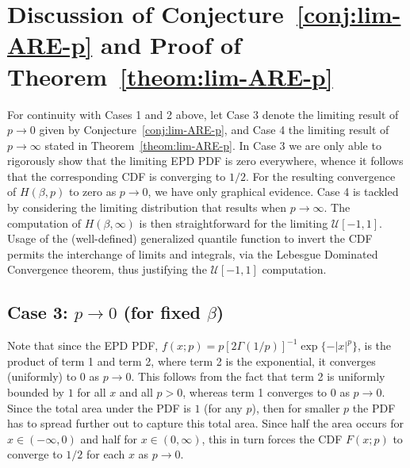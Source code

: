 \documentclass[11pt]{article}
\newcommand{\cb}{\color{blue}}
\newcommand{\nc}{\normalcolor}
\begin{document}
\cb
\section{Discussion of Conjecture~\ref{conj:lim-ARE-p} and Proof of Theorem~\ref{theom:lim-ARE-p}}\label{app:lims-theom-p}

For continuity with Cases 1 and 2 above, let Case 3 denote the limiting result of $p \rightarrow 0$ given by
Conjecture~\ref{conj:lim-ARE-p}, and Case 4 the limiting result of $p
\rightarrow \infty$ stated in Theorem~\ref{theom:lim-ARE-p}.
\nc In Case 3 we are only able to rigorously show
that the limiting EPD PDF is zero everywhere, whence it follows
that the corresponding CDF is converging to $1/2$. 
For the resulting convergence of $H(\beta,p)$ to zero as $p
\rightarrow 0$, we
have only graphical evidence. Case 4 is  tackled by considering the limiting
distribution that results when $p \rightarrow\infty$. The computation of $H(\beta,\infty)$
is then straightforward for the limiting $\mathcal{U}[-1,1]$. Usage
of the (well-defined) generalized quantile function to invert the CDF
permits the interchange of limits and integrals, via
the Lebesgue Dominated Convergence theorem, thus justifying the $\mathcal{U}[-1,1]$ computation. 
\subsection*{Case 3: $p \rightarrow 0$ (for fixed $\beta$)}
 
Note that since the EPD PDF, $f(x;p) =
 p[2\Gamma(1/p)]^{-1}\exp\{-|x|^p\}$,  is the
product of term 1 and term 2, where term 2 is the exponential, \cb  it converges
(uniformly) to $0$  as $p\rightarrow 0$\nc.  This follows
from the fact that term 2 is uniformly bounded by $1$ for all $x$ and
all $p>0$, whereas term 1 converges to $0$ as $p\rightarrow 0$.  Since
the total area under the PDF is $1$ (for any $p$), then for smaller
$p$ the PDF has to spread further out to capture this total
area. Since half the area occurs for $x\in(-\infty,0)$ and half for
$x\in(0,\infty)$, this in turn forces the CDF $F(x;p)$ to converge to
$1/2$ for each $x$ as $p\rightarrow 0$. 
\end{document}
